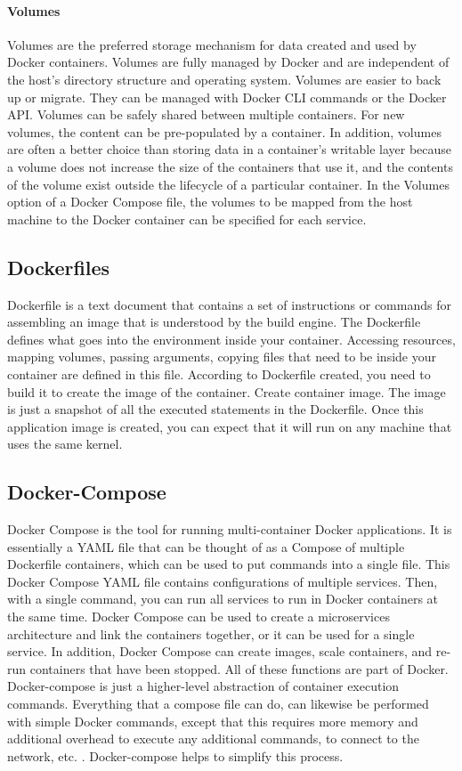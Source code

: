 		\paragraph{Volumes}
		Volumes are the preferred storage mechanism for data created and used by Docker containers. Volumes are fully managed by Docker and are independent of the host's directory structure and operating system. Volumes are easier to back up or migrate. They can be managed with Docker CLI commands or the Docker API. Volumes can be safely shared between multiple containers. For new volumes, the content can be pre-populated by a container. In addition, volumes are often a better choice than storing data in a container's writable layer because a volume does not increase the size of the containers that use it, and the contents of the volume exist outside the lifecycle of a particular container. In the Volumes option of a Docker Compose file, the volumes to be mapped from the host machine to the Docker container can be specified for each service.\cite{dockerStorage}
			
		\subsection{Dockerfiles}
		\label{Grundlagen:Docker:Dockerfiles}	
		Dockerfile is a text document that contains a set of instructions or commands for assembling an image that is understood by the build engine. The Dockerfile defines what goes into the environment inside your container. Accessing resources, mapping volumes, passing arguments, copying files that need to be inside your container are defined in this file. According to Dockerfile created, you need to build it to create the image of the container. Create container image. The image is just a snapshot of all the executed statements in the Dockerfile. Once this application image is created, you can expect that it will run on any machine that uses the same kernel. 
		
		\subsection{Docker-Compose}
		\label{Grundlagen:Docker:Docker-Compose}	
		Docker Compose is the tool for running multi-container Docker applications. It is essentially a YAML file that can be thought of as a Compose of multiple Dockerfile containers, which can be used to put commands into a single file. This Docker Compose YAML file contains configurations of multiple services. Then, with a single command, you can run all services to run in Docker containers at the same time.
		Docker Compose can be used to create a microservices architecture and link the containers together, or it can be used for a single service. In addition, Docker Compose can create images, scale containers, and re-run containers that have been stopped. All of these functions are part of Docker. Docker-compose is just a higher-level abstraction of container execution commands. Everything that a compose file can do, can likewise be performed with simple Docker commands, except that this requires more memory and additional overhead to execute any additional commands, to connect to the network, etc. . Docker-compose helps to simplify this process.
				
